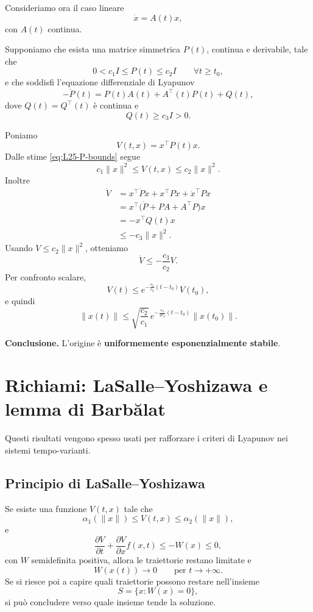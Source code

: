 Consideriamo ora il caso lineare
\[
\dot x = A(t)x,
\]
con \(A(t)\) continua.

Supponiamo che esista una matrice simmetrica \(P(t)\), continua e derivabile, tale che
\begin{equation}
\label{eq:L25-P-bounds}
0<c_1 I \le P(t)\le c_2 I
\qquad \forall t\ge t_0,
\end{equation}
e che soddisfi l'equazione differenziale di Lyapunov
\begin{equation}
\label{eq:L25-lyap-diff}
-\dot P(t)=P(t)A(t)+A^\top(t)P(t)+Q(t),
\end{equation}
dove \(Q(t)=Q^\top(t)\) \`e continua e
\begin{equation}
\label{eq:L25-Q-lower}
Q(t)\ge c_3 I>0.
\end{equation}

Poniamo
\[
V(t,x)=x^\top P(t)x.
\]
Dalle stime \eqref{eq:L25-P-bounds} segue
\[
c_1\|x\|^2 \le V(t,x)\le c_2\|x\|^2.
\]
Inoltre
\begin{align*}
\dot V
&=
x^\top \dot P x + x^\top P \dot x + \dot x^\top P x\\
&=
x^\top\bigl(\dot P + PA + A^\top P\bigr)x\\
&=
-x^\top Q(t)x\\
&\le -c_3\|x\|^2.
\end{align*}
Usando \(V\le c_2\|x\|^2\), otteniamo
\[
\dot V \le -\frac{c_3}{c_2}V.
\]
Per confronto scalare,
\[
V(t)\le e^{-\frac{c_3}{c_2}(t-t_0)}V(t_0),
\]
e quindi
\[
\|x(t)\|
\le
\sqrt{\frac{c_2}{c_1}}
\,e^{-\frac{c_3}{2c_2}(t-t_0)}
\|x(t_0)\|.
\]

\medskip

\noindent
\textbf{Conclusione.}
L'origine \`e \textbf{uniformemente esponenzialmente stabile}.

\section{Richiami: LaSalle--Yoshizawa e lemma di Barb\u{a}lat}

Questi risultati vengono spesso usati per rafforzare i criteri di Lyapunov nei sistemi tempo-varianti.

\subsection{Principio di LaSalle--Yoshizawa}

Se esiste una funzione \(V(t,x)\) tale che
\[
\alpha_1(\|x\|)\le V(t,x)\le \alpha_2(\|x\|),
\]
e
\[
\frac{\partial V}{\partial t} + \frac{\partial V}{\partial x}f(x,t)\le -W(x)\le 0,
\]
con \(W\) semidefinita positiva, allora le traiettorie restano limitate e
\[
W(x(t))\to 0 \qquad \text{per } t\to+\infty.
\]
Se si riesce poi a capire quali traiettorie possono restare nell'insieme
\[
S=\{x:W(x)=0\},
\]
si pu\`o concludere verso quale insieme tende la soluzione.

